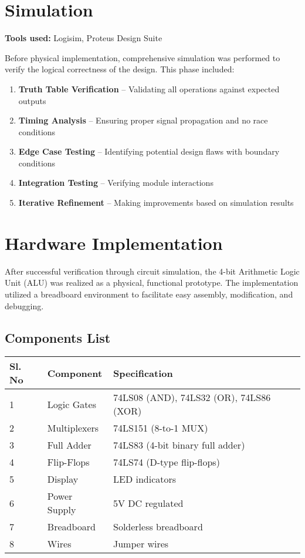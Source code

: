 \section{Simulation}

\textbf{Tools used:} Logisim, Proteus Design Suite

Before physical implementation, comprehensive simulation was performed to verify the logical correctness of the design. This phase included:

\begin{enumerate}
    \item \textbf{Truth Table Verification} -- Validating all operations against expected outputs
    \item \textbf{Timing Analysis} -- Ensuring proper signal propagation and no race conditions
    \item \textbf{Edge Case Testing} -- Identifying potential design flaws with boundary conditions
    \item \textbf{Integration Testing} -- Verifying module interactions
    \item \textbf{Iterative Refinement} -- Making improvements based on simulation results
\end{enumerate}

\section{Hardware Implementation}

After successful verification through circuit simulation, the 4-bit Arithmetic Logic Unit (ALU) was realized as a physical, functional prototype. The implementation utilized a breadboard environment to facilitate easy assembly, modification, and debugging.

\subsection{Components List}

\begin{table}
\centering
\begin{tabular}{lll}
\toprule
\textbf{Sl. No} & \textbf{Component} & \textbf{Specification} \\
\midrule
1 & Logic Gates & 74LS08 (AND), 74LS32 (OR), 74LS86 (XOR) \\
2 & Multiplexers & 74LS151 (8-to-1 MUX) \\
3 & Full Adder & 74LS83 (4-bit binary full adder) \\
4 & Flip-Flops & 74LS74 (D-type flip-flops) \\
5 & Display & LED indicators \\
6 & Power Supply & 5V DC regulated \\
7 & Breadboard & Solderless breadboard \\
8 & Wires & Jumper wires \\
\bottomrule
\end{tabular}
\label{tab:components}
\end{table}

